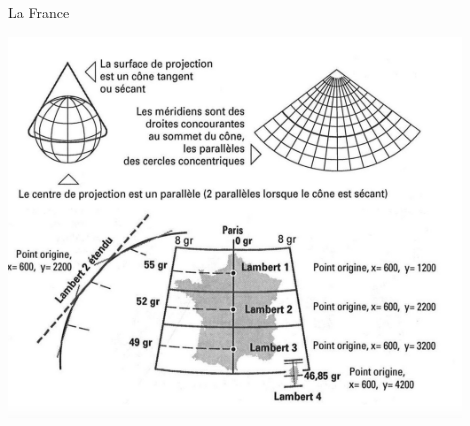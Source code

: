 \documentclass[8pt,ignorenonframetext,]{beamer}
\begin{document}
\begin{frame}{La France}

\begin{center}
  \includegraphics[width=0.9\textwidth]{figSaby3.png} 
\end{center}

\end{frame}
\end{document}
